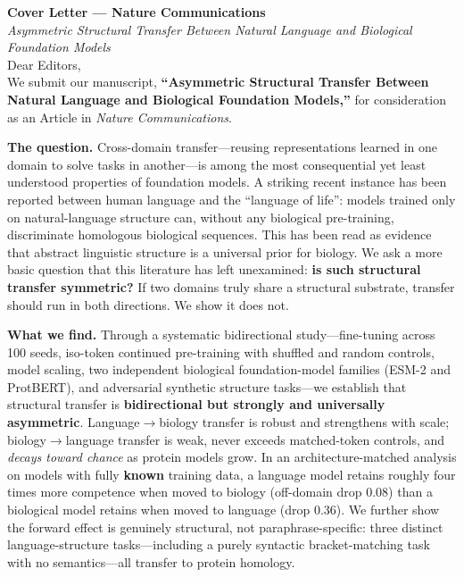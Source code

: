 \documentclass[11pt]{article}
\begin{document}
\thispagestyle{empty}

\noindent\textbf{Cover Letter --- Nature Communications}\\[0.3em]
\noindent\emph{Asymmetric Structural Transfer Between Natural Language and Biological Foundation Models}\\[1em]

\noindent Dear Editors,\\[0.5em]

We submit our manuscript, \textbf{``Asymmetric Structural Transfer Between Natural Language and
Biological Foundation Models,''} for consideration as an Article in \emph{Nature Communications}.

\textbf{The question.} Cross-domain transfer---reusing representations learned in one domain to
solve tasks in another---is among the most consequential yet least understood properties of
foundation models. A striking recent instance has been reported between human language and the
``language of life'': models trained only on natural-language structure can, without any biological
pre-training, discriminate homologous biological sequences. This has been read as evidence that
abstract linguistic structure is a universal prior for biology. We ask a more basic question that
this literature has left unexamined: \textbf{is such structural transfer symmetric?} If two domains
truly share a structural substrate, transfer should run in both directions. We show it does not.

\textbf{What we find.} Through a systematic bidirectional study---fine-tuning across 100 seeds,
iso-token continued pre-training with shuffled and random controls, model scaling, two independent
biological foundation-model families (ESM-2 and ProtBERT), and adversarial synthetic structure
tasks---we establish that structural transfer is \textbf{bidirectional but strongly and universally
asymmetric}. Language$\rightarrow$biology transfer is robust and strengthens with scale;
biology$\rightarrow$language transfer is weak, never exceeds matched-token controls, and
\emph{decays toward chance} as protein models grow. In an architecture-matched analysis on models
with fully \textbf{known} training data, a language model retains roughly four times more competence
when moved to biology (off-domain drop 0.08) than a biological model retains when moved to language
(drop 0.36). We further show the forward effect is genuinely structural, not paraphrase-specific:
three distinct language-structure tasks---including a purely syntactic bracket-matching task with no
semantics---all transfer to protein homology.
\end{document}
